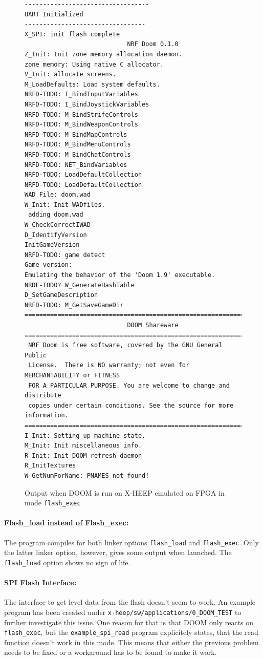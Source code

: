 \begin{figure}[!h]
{\fontsize{9}{11}\selectfont
\begin{Verbatim}[frame=single]
----------------------------------
UART Initialized
---------------------------------
X_SPI: init flash complete
                            NRF Doom 0.1.0
Z_Init: Init zone memory allocation daemon. 
zone memory: Using native C allocator.
V_Init: allocate screens.
M_LoadDefaults: Load system defaults.
NRFD-TODO: I_BindInputVariables
NRFD-TODO: I_BindJoystickVariables
NRFD-TODO: M_BindStrifeControls
NRFD-TODO: M_BindWeaponControls
NRFD-TODO: M_BindMapControls
NRFD-TODO: M_BindMenuControls
NRFD-TODO: M_BindChatControls
NRFD-TODO: NET_BindVariables
NRFD-TODO: LoadDefaultCollection
NRFD-TODO: LoadDefaultCollection
WAD File: doom.wad
W_Init: Init WADfiles.
 adding doom.wad
W_CheckCorrectIWAD
D_IdentifyVersion
InitGameVersion
NRFD-TODO: game detect
Game version: 
Emulating the behavior of the 'Doom 1.9' executable.
NRDF-TODO? W_GenerateHashTable
D_SetGameDescription
NRFD-TODO: M_GetSaveGameDir
===========================================================================
                            DOOM Shareware
===========================================================================
 NRF Doom is free software, covered by the GNU General Public
 License.  There is NO warranty; not even for MERCHANTABILITY or FITNESS
 FOR A PARTICULAR PURPOSE. You are welcome to change and distribute
 copies under certain conditions. See the source for more information.
===========================================================================
I_Init: Setting up machine state.
M_Init: Init miscellaneous info.
R_Init: Init DOOM refresh daemon
R_InitTextures
W_GetNumForName: PNAMES not found!
\end{Verbatim}
}
\caption{Output when DOOM is run on X-HEEP emulated on FPGA in mode \texttt{flash\_exec}}
\label{fig:cutecomOutput}
\end{figure}

\paragraph{Flash\_load instead of Flash\_exec:} The program compiles for both linker options \texttt{flash\_load} and \texttt{flash\_exec}. Only the latter linker option, however, gives some output when launched. The \texttt{flash\_load} option shows no sign of life. \\

\paragraph{SPI Flash Interface:} The interface to get level data from the flash doesn't seem to work. An example program has been created under \texttt{x-heep/sw/applications/0\_DOOM\_TEST} to further investigate this issue. One reason for that is that DOOM only reacts on \texttt{flash\_exec}, but the \texttt{example\_spi\_read} program explicitely states, that the read function doesn't work in this mode. This means that either the previous problem needs to be fixed or a workaround has to be found to make it work. \\





